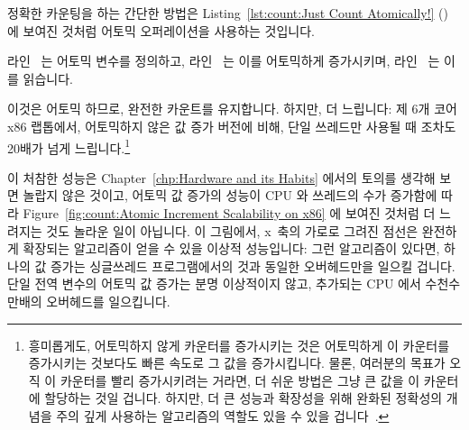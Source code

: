 정확한 카운팅을 하는 간단한 방법은
Listing~\ref{lst:count:Just Count Atomically!} ()
에 보여진 것처럼 어토믹 오퍼레이션을 사용하는 것입니다.
\begin{fcvref}
라인~ 는 어토믹 변수를 정의하고, 라인~ 는 이를
어토믹하게 증가시키며, 라인~ 는 이를 읽습니다.
\end{fcvref}
이것은 어토믹 하므로, 완전한 카운트를 유지합니다.
하지만, 더 느립니다: 제 6개 코어 x86 랩톱에서, 어토믹하지 않은 값 증가 버전에
비해, 단일 쓰레드만 사용될 때 조차도 20배가 넘게 느립니다.\footnote{
	흥미롭게도, 어토믹하지 않게 카운터를 증가시키는 것은 어토믹하게 이
	카운터를 증가시키는 것보다도 빠른 속도로 그 값을 증가시킵니다.
	물론, 여러분의 목표가 오직 이 카운터를 빨리 증가시키려는 거라면, 더
	쉬운 방법은 그냥 큰 값을 이 카운터에 할당하는 것일 겁니다.
	하지만, 더 큰 성능과 확장성을 위해 완화된 정확성의 개념을 주의 깊게
	사용하는 알고리즘의 역할도 있을 수 있을
	겁니다~\cite{Andrews91textbook,Arcangeli03,10.5555/3241639.3241645,DavidUngar2011unsync}.}

이 처참한 성능은
Chapter~\ref{chp:Hardware and its Habits}
에서의 토의를 생각해 보면 놀랍지 않은 것이고, 어토믹 값 증가의 성능이 CPU 와
쓰레드의 수가 증가함에 따라
Figure~\ref{fig:count:Atomic Increment Scalability on x86}
에 보여진 것처럼 더 느려지는 것도 놀라운 일이 아닙니다.
이 그림에서, x~축의 가로로 그려진 점선은 완전하게 확장되는 알고리즘이 얻을 수
있을 이상적 성능입니다: 그런 알고리즘이 있다면, 하나의 값 증가는 싱글쓰레드
프로그램에서의 것과 동일한 오버헤드만을 일으킬 겁니다.
단일 전역 변수의 어토믹 값 증가는 분명 이상적이지 않고, 추가되는 CPU 에서
수천수만배의 오버헤드를 일으킵니다.

